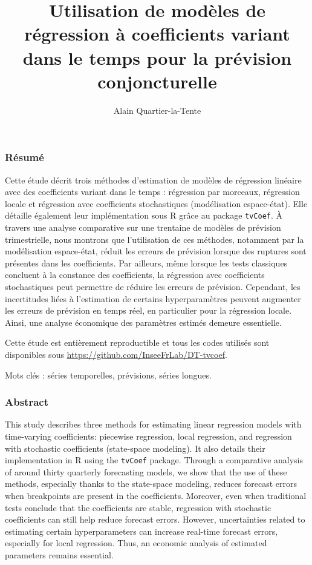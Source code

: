 \documentclass[
  a4paper,
  DIV=11,
  numbers=noendperiod,
  french]{scrartcl}
\title{Utilisation de modèles de régression à coefficients variant dans
le temps pour la prévision conjoncturelle}
\author{Alain Quartier-la-Tente}
\date{}
\newcommand\1{{\mathds 1}}
\theoremstyle{remark}
\begin{document}
\maketitle

\renewcommand{\thepage}{\roman{page}}

\subsubsection*{Résumé}\label{ruxe9sumuxe9}

Cette étude décrit trois méthodes d'estimation de modèles de régression
linéaire avec des coefficients variant dans le temps : régression par
morceaux, régression locale et régression avec coefficients
stochastiques (modélisation espace-état). Elle détaille également leur
implémentation sous R grâce au package \texttt{tvCoef}. À travers une
analyse comparative sur une trentaine de modèles de prévision
trimestrielle, nous montrons que l'utilisation de ces méthodes,
notamment par la modélisation espace-état, réduit les erreurs de
prévision lorsque des ruptures sont présentes dans les coefficients. Par
ailleurs, même lorsque les tests classiques concluent à la constance des
coefficients, la régression avec coefficients stochastiques peut
permettre de réduire les erreurs de prévision. Cependant, les
incertitudes liées à l'estimation de certains hyperparamètres peuvent
augmenter les erreurs de prévision en temps réel, en particulier pour la
régression locale. Ainsi, une analyse économique des paramètres estimés
demeure essentielle.

Cette étude est entièrement reproductible et tous les codes utilisés
sont disponibles sous \url{https://github.com/InseeFrLab/DT-tvcoef}.

Mots clés : séries temporelles, prévisions, séries longues.

\subsubsection*{Abstract}\label{abstract}

This study describes three methods for estimating linear regression
models with time-varying coefficients: piecewise regression, local
regression, and regression with stochastic coefficients (state-space
modeling). It also details their implementation in R using the
\texttt{tvCoef} package. Through a comparative analysis of around thirty
quarterly forecasting models, we show that the use of these methods,
especially thanks to the state-space modeling, reduces forecast errors
when breakpoints are present in the coefficients. Moreover, even when
traditional tests conclude that the coefficients are stable, regression
with stochastic coefficients can still help reduce forecast errors.
However, uncertainties related to estimating certain hyperparameters can
increase real-time forecast errors, especially for local regression.
Thus, an economic analysis of estimated parameters remains essential.
\end{document}

